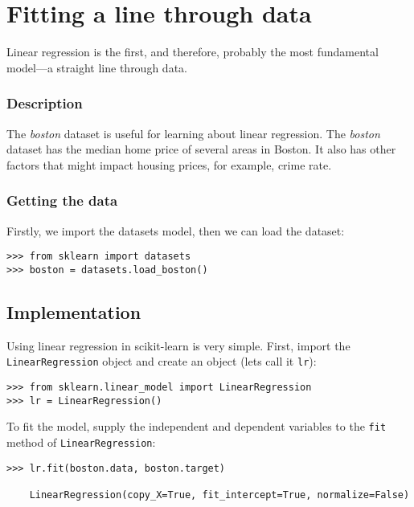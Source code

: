 \documentclass[SKL-MASTER.tex]{subfiles}
\begin{document}
	\Large
\section*{Fitting a line through data}
Linear regression is the first, and therefore, probably the most fundamental
model—a straight line through data.
\subsubsection*{Description}
The \textit{boston} dataset is useful for learning about  linear regression. The \textit{boston} dataset has the
median home price of several areas in Boston. It also has other factors that might impact
housing prices, for example, crime rate.
\subsubsection*{Getting the data}
Firstly, we import the datasets model, then we can load the dataset:
\begin{framed}
\begin{verbatim}
>>> from sklearn import datasets
>>> boston = datasets.load_boston()
\end{verbatim}
\end{framed}
\subsection*{Implementation}
Using linear regression in scikit-learn is very simple. 
First, import the \texttt{LinearRegression} object and create an object (lets call it \texttt{lr}):
\begin{framed}
\begin{verbatim}
>>> from sklearn.linear_model import LinearRegression
>>> lr = LinearRegression()
\end{verbatim}
\end{framed}
To fit the model, supply the independent and dependent variables to the \texttt{fit} method of
\texttt{LinearRegression}:
\begin{framed}
	\begin{verbatim}
>>> lr.fit(boston.data, boston.target)
	
	LinearRegression(copy_X=True, fit_intercept=True, normalize=False)
\end{verbatim}
\end{framed}
\end{document}
